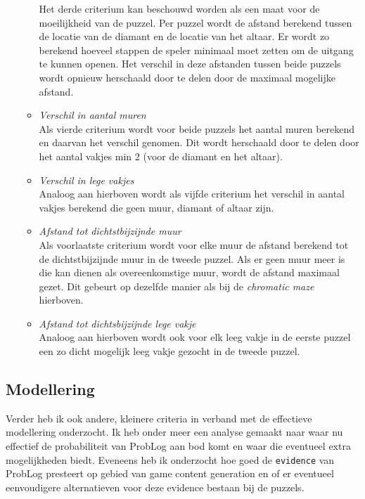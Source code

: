 \documentclass{article}
\begin{document}
\begin{itemize}
\begin{itemize}
Het derde criterium kan beschouwd worden als een maat voor de moeilijkheid van  de puzzel. Per puzzel wordt de afstand berekend tussen de locatie van de diamant en de locatie van het altaar. Er wordt zo berekend hoeveel stappen de speler minimaal moet zetten om de uitgang te kunnen openen. Het verschil in deze afstanden tussen beide puzzels wordt opnieuw herschaald door te delen door de maximaal mogelijke afstand.
\item \textit{Verschil in aantal muren}\\
Als vierde criterium wordt voor beide puzzels het aantal muren berekend en daarvan het verschil genomen. Dit wordt herschaald door te delen door het aantal vakjes min 2 (voor de diamant en het altaar).
\item \textit{Verschil in lege vakjes}\\
Analoog aan hierboven wordt als vijfde criterium het verschil in aantal vakjes berekend die geen muur, diamant of altaar zijn.
\item \textit{Afstand tot dichtstbijzijnde muur}\\
Als voorlaatste criterium wordt voor elke muur de afstand berekend tot de dichtstbijzijnde muur in de tweede puzzel. Als er geen muur meer is die kan dienen als overeenkomstige muur, wordt de afstand maximaal gezet. Dit gebeurt op dezelfde manier als bij de \textit{chromatic maze} hierboven.
\item \textit{Afstand tot dichtsbijzijnde lege vakje}\\
Analoog aan hierboven wordt ook voor elk leeg vakje in de eerste puzzel een zo dicht mogelijk leeg vakje gezocht in de tweede puzzel.
\end{itemize}

\end{itemize}

\subsection{Modellering}
Verder heb ik ook andere, kleinere criteria in verband met de effectieve modellering onderzocht. Ik heb onder meer een analyse gemaakt naar waar nu effectief de probabiliteit van ProbLog aan bod komt en waar die eventueel extra mogelijkheden biedt. Eveneens heb ik onderzocht hoe goed de \texttt{evidence} van ProbLog presteert op gebied van game content generation en of er eventueel eenvoudigere alternatieven voor deze evidence bestaan bij de puzzels.
\end{document}
